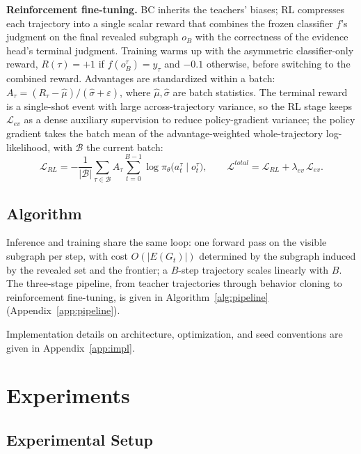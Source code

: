 \documentclass{article}
\begin{document}
\textbf{Reinforcement fine-tuning.} BC inherits the teachers' biases; RL compresses each trajectory into a single scalar reward that combines the frozen classifier $f$'s judgment on the final revealed subgraph $o_B$ with the correctness of the evidence head's terminal judgment. Training warms up with the asymmetric classifier-only reward, $R(\tau)=+1$ if $f(o_B^{\tau})=y_\tau$ and $-0.1$ otherwise, before switching to the combined reward. Advantages are standardized within a batch: $A_\tau=(R_\tau-\hat\mu)/(\hat\sigma+\varepsilon)$, where $\hat\mu,\hat\sigma$ are batch statistics. The terminal reward is a single-shot event with large across-trajectory variance, so the RL stage keeps $\mathcal L_{ev}$ as a dense auxiliary supervision to reduce policy-gradient variance; the policy gradient takes the batch mean of the advantage-weighted whole-trajectory log-likelihood, with $\mathcal B$ the current batch:
\[
\mathcal{L}_{RL}= -\frac{1}{|\mathcal{B}|}\sum_{\tau\in\mathcal{B}}A_\tau\sum_{t=0}^{B-1}\log\pi_\theta\big(a_t^{\tau}\mid o_t^{\tau}\big),
\qquad
\mathcal{L}^{total}=\mathcal{L}_{RL}+\lambda_{ev}\,\mathcal{L}_{ev}.
\]

\subsection{Algorithm}
\label{subsec:algo}

Inference and training share the same loop: one forward pass on the visible subgraph per step, with cost $O(|E(G_t)|)$ determined by the subgraph induced by the revealed set and the frontier; a $B$-step trajectory scales linearly with $B$. The three-stage pipeline, from teacher trajectories through behavior cloning to reinforcement fine-tuning, is given in Algorithm~\ref{alg:pipeline} (Appendix~\ref{app:pipeline}).

Implementation details on architecture, optimization, and seed conventions are given in Appendix~\ref{app:impl}.

\section{Experiments}
\label{sec:experiments}

\subsection{Experimental Setup}
\label{subsec:exp-setup}
\end{document}
